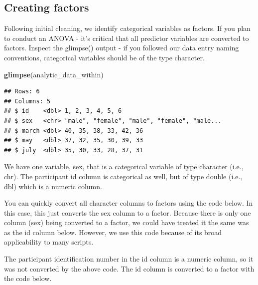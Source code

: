 \documentclass[
]{krantz}
\makeatletter
\newenvironment{Shaded}{\begin{snugshade}}{\end{snugshade}}
\newcommand{\DataTypeTok}[1]{\textcolor[rgb]{0.27,0.27,0.27}{#1}}
\newcommand{\KeywordTok}[1]{\textcolor[rgb]{0.27,0.27,0.27}{\textbf{#1}}}
\newcommand{\NormalTok}[1]{#1}
\newcommand{\OperatorTok}[1]{\textcolor[rgb]{0.43,0.43,0.43}{\textbf{#1}}}
\newcommand{\StringTok}[1]{\textcolor[rgb]{0.5,0.5,0.5}{#1}}
\newenvironment{kframe}{%
\medskip{}
\setlength{\fboxsep}{.8em}
 \def\at@end@of@kframe{}%
 \ifinner\ifhmode%
  \def\at@end@of@kframe{\end{minipage}}%
  \begin{minipage}{\columnwidth}%
 \fi\fi%
 \def\FrameCommand##1{\hskip\@totalleftmargin \hskip-\fboxsep
 \colorbox{shadecolor}{##1}\hskip-\fboxsep
     \hskip-\linewidth \hskip-\@totalleftmargin \hskip\columnwidth}%
 \MakeFramed {\advance\hsize-\width
   \@totalleftmargin\z@ \linewidth\hsize
   \@setminipage}}%
 {\par\unskip\endMakeFramed%
 \at@end@of@kframe}
\renewenvironment{Shaded}{\begin{kframe}}{\end{kframe}}
\makeatother
\begin{document}
\hypertarget{creating-factors-1}{%
\subsection{Creating factors}\label{creating-factors-1}}

Following initial cleaning, we identify categorical variables as factors. If you plan to conduct an ANOVA - it's critical that all predictor variables are converted to factors. Inspect the glimpse() output - if you followed our data entry naming conventions, categorical variables should be of the type character.

\begin{Shaded}
\begin{Highlighting}[]
\KeywordTok{glimpse}\NormalTok{(analytic_data_within)}
\end{Highlighting}
\end{Shaded}

\begin{verbatim}
## Rows: 6
## Columns: 5
## $ id    <dbl> 1, 2, 3, 4, 5, 6
## $ sex   <chr> "male", "female", "male", "female", "male...
## $ march <dbl> 40, 35, 38, 33, 42, 36
## $ may   <dbl> 37, 32, 35, 30, 39, 33
## $ july  <dbl> 35, 30, 33, 28, 37, 31
\end{verbatim}

We have one variable, sex, that is a categorical variable of type character (i.e., chr). The participant id column is categorical as well, but of type double (i.e., dbl) which is a numeric column.

You can quickly convert all character columns to factors using the code below. In this case, this just converts the sex column to a factor. Because there is only one column (sex) being converted to a factor, we could have treated it the same was as the id column below. However, we use this code because of its broad applicability to many scripts.

\begin{Shaded}
\end{Shaded}

The participant identification number in the id column is a numeric column, so it was not converted by the above code. The id column is converted to a factor with the code below.
\end{document}
